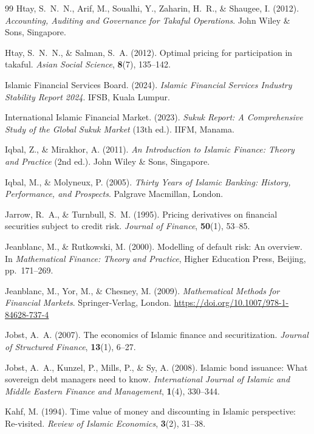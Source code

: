 \documentclass[10pt,twocolumn]{article}
\theoremstyle{plain}
\theoremstyle{definition}
\begin{document}
\begin{thebibliography}{99}
Htay, S.~N.~N., Arif, M., Soualhi, Y., Zaharin, H.~R., \&
Shaugee, I. (2012).
\textit{Accounting, Auditing and Governance for Takaful
Operations}.
John Wiley \& Sons, Singapore.

Htay, S.~N.~N., \& Salman, S.~A. (2012).
Optimal pricing for participation in takaful.
\textit{Asian Social Science}, \textbf{8}(7), 135--142.

Islamic Financial Services Board. (2024).
\textit{Islamic Financial Services Industry Stability Report 2024}.
IFSB, Kuala Lumpur.

International Islamic Financial Market. (2023).
\textit{Sukuk Report: A Comprehensive Study of the Global Sukuk
Market} (13th ed.). IIFM, Manama.

Iqbal, Z., \& Mirakhor, A. (2011).
\textit{An Introduction to Islamic Finance: Theory and Practice}
(2nd ed.).
John Wiley \& Sons, Singapore.

Iqbal, M., \& Molyneux, P. (2005).
\textit{Thirty Years of Islamic Banking: History, Performance,
and Prospects}.
Palgrave Macmillan, London.

Jarrow, R.~A., \& Turnbull, S.~M. (1995).
Pricing derivatives on financial securities subject to credit risk.
\textit{Journal of Finance}, \textbf{50}(1), 53--85.

Jeanblanc, M., \& Rutkowski, M. (2000).
Modelling of default risk: An overview.
In \textit{Mathematical Finance: Theory and Practice},
Higher Education Press, Beijing, pp.~171--269.

Jeanblanc, M., Yor, M., \& Chesney, M. (2009).
\textit{Mathematical Methods for Financial Markets}.
Springer-Verlag, London.
\url{https://doi.org/10.1007/978-1-84628-737-4}

Jobst, A.~A. (2007).
The economics of Islamic finance and securitization.
\textit{Journal of Structured Finance}, \textbf{13}(1), 6--27.

Jobst, A.~A., Kunzel, P., Mills, P., \& Sy, A. (2008).
Islamic bond issuance: What sovereign debt managers need to know.
\textit{International Journal of Islamic and Middle Eastern Finance
and Management}, \textbf{1}(4), 330--344.

Kahf, M. (1994).
Time value of money and discounting in Islamic perspective:
Re-visited.
\textit{Review of Islamic Economics}, \textbf{3}(2), 31--38.


\end{thebibliography}
\end{document}
